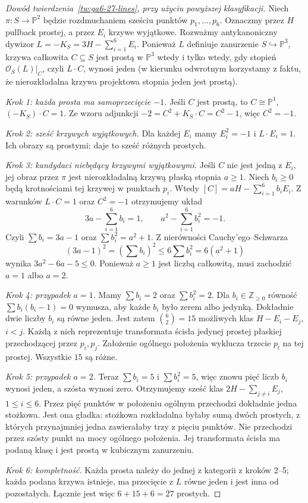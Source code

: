 \documentclass[11pt,a4paper,openany]{report}
\numberwithin{equation}{section}
\theoremstyle{plain}
\theoremstyle{definition}
\theoremstyle{remark}
\newcommand{\Z}{\mathbb Z}
\newcommand{\PP}{\mathbb P}
\begin{document}
\begin{proof}[Dowód twierdzenia~\ref{tw:ga6-27-lines}, przy użyciu powyższej klasyfikacji]
Niech $\pi:S\to\PP^2$ będzie rozdmuchaniem
sześciu punktów $p_1,\ldots,p_6$. Oznaczmy
przez $H$ pullback prostej, a przez $E_i$
krzywe wyjątkowe. Rozważmy antykanoniczny
dywizor $L=-K_S=3H-\sum_{i=1}^6E_i$.
Ponieważ $L$ definiuje zanurzenie $S\hookrightarrow\PP^3$,
krzywa całkowita $C\subseteq S$ jest prostą
w $\PP^3$ wtedy i tylko wtedy, gdy stopień
$\mathcal O_S(L)|_C$, czyli $L\cdot C$, wynosi jeden
(w kierunku odwrotnym korzystamy z faktu, że
nierozkładalna krzywa projektowa stopnia jeden
jest prostą).

\emph{Krok 1: każda prosta ma samoprzecięcie $-1$.}
Jeśli $C$ jest prostą, to $C\cong\PP^1$,
$(-K_S)\cdot C=1$. Ze wzoru adjunkcji
$-2=C^2+K_S\cdot C=C^2-1$, więc $C^2=-1$.

\emph{Krok 2: sześć krzywych wyjątkowych.}
Dla każdej $E_i$ mamy $E_i^2=-1$ i
$L\cdot E_i=1$. Ich obrazy są prostymi;
daje to sześć różnych prostych.

\emph{Krok 3: kandydaci niebędący krzywymi wyjątkowymi.}
Jeśli $C$ nie jest jedną z $E_i$, jej obraz przez
$\pi$ jest nierozkładalną krzywą płaską stopnia
$a\ge1$. Niech $b_i\ge0$ będą krotnościami
tej krzywej w punktach $p_i$. Wtedy
$[C]=aH-\sum_{i=1}^6b_iE_i$. Z warunków
$L\cdot C=1$ oraz $C^2=-1$ otrzymujemy układ
\[
 3a-\sum_{i=1}^6b_i=1,\qquad
 a^2-\sum_{i=1}^6b_i^2=-1.
\]
Czyli $\sum b_i=3a-1$ oraz
$\sum b_i^2=a^2+1$. Z nierówności Cauchy'ego--Schwarza
\[
 (3a-1)^2=\left(\sum b_i\right)^2
 \le6\sum b_i^2=6(a^2+1)
\]
wynika $3a^2-6a-5\le0$. Ponieważ $a\ge1$
jest liczbą całkowitą, musi zachodzić $a=1$ albo $a=2$.

\emph{Krok 4: przypadek $a=1$.}
Mamy $\sum b_i=2$ oraz $\sum b_i^2=2$.
Dla $b_i\in\Z_{\ge0}$ równość
$\sum b_i(b_i-1)=0$ wymusza, aby każde
$b_i$ było zerem albo jedynką. Dokładnie dwie
liczby $b_i$ są równe jeden. Jest zatem
$\binom{6}{2}=15$ możliwych klas
$H-E_i-E_j$, $i<j$. Każdą z nich reprezentuje
transformata ścisła jedynej prostej płaskiej
przechodzącej przez $p_i,p_j$. Założenie
ogólnego położenia wyklucza trzecie $p_l$
na tej prostej. Wszystkie $15$ są różne.

\emph{Krok 5: przypadek $a=2$.}
Teraz $\sum b_i=5$ i $\sum b_i^2=5$,
więc znowu pięć liczb $b_i$ wynosi jeden,
a szósta wynosi zero. Otrzymujemy sześć klas
$2H-\sum_{j\ne i}E_j$, $1\le i\le6$.
Przez pięć punktów w położeniu ogólnym przechodzi
dokładnie jedna stożkowa. Jest ona gładka:
stożkowa rozkładalna byłaby sumą dwóch prostych,
z których przynajmniej jedna zawierałaby trzy
z pięciu punktów. Nie przechodzi przez szósty
punkt na mocy ogólnego położenia. Jej transformata
ścisła ma podaną klasę i jest prostą w kubicznym
zanurzeniu.

\emph{Krok 6: kompletność.}
Każda prosta należy do jednej z kategorii z
kroków 2--5; każda podana krzywa istnieje,
ma przecięcie z $L$ równe jeden i jest inna
od pozostałych. Łącznie jest więc
$6+15+6=27$ prostych.
\end{proof}
\end{document}
